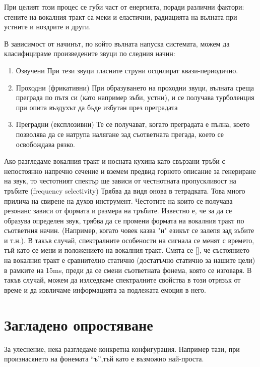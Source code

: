 \documentclass[12pt]{report}
\numberwithin{equation}{section}
\numberwithin{figure}{section}
\begin{document}
    При целият този процес се губи част от енергията, поради различни фактори: стените на вокалния тракт са меки и еластични, радиацията на вълната при устните и ноздрите и други.

    В зависимост от начинът, по който вълната напуска системата, можем да класифицираме произведените звуци по следния начин:

    \begin{enumerate}
        \item Озвучени 
        При тези звуци гласните струни осцилират квази-периодично.
        \item Проходни (фрикативни) 
        При образуването на проходни звуци, вълната среща преграда по пътя си
            (като например зъби, устни), и се получава турболенция при опита въздухът да бъде избутан през преградата
        \item Преградни (експлозивни)
        Те се получават, когато преградата е пълна, което позволява да се натрупа налягане
        зад съответната прегада, което се освобождава рязко.
    \end{enumerate}
    
    Ако разгледаме вокалния тракт и носната кухина като свързани тръби с непостоянно напречно сечение и вземем предвид горното описание за генериране на звук,
    то честотният спектър ще зависи от честнотната пропускливост на тръбите (frequency selectivity) Трябва да видя онова в тетрадката. Това много прилича на свирене на духов инструмент.
    Честотите на които се получава резонанс зависи от формата и размера на тръбите. Известно е, че за да се образува определен звук, трябва да се промени формата на вокалния тракт по 
    съответния начин. (Например, когато човек казва "н" езикът се залепя зад зъбите и т.н.). В такъв случай, спектралните особености на сигнала се менят с времето, тъй като се мени и
    положението на вокалния тракт. Смята се [], че състоянието на вокалния тракт е сравнително статично (достатъчно статично за нашите цели) в рамките на 15ms, преди да се смени съответната
    фонема, която се изговаря. В такъв случай, можем да излседваме спектралните свойства в този отрязък от време и да извличаме информацията за подлежата емоция в него. 

    \section{Загладено опростяване}
    За улеснение, нека разгледаме конкретна конфигурация. Например тази, при произнасянето на фонемата ``ъ'',тъй като е възможно най-проста.
    
\end{document}
